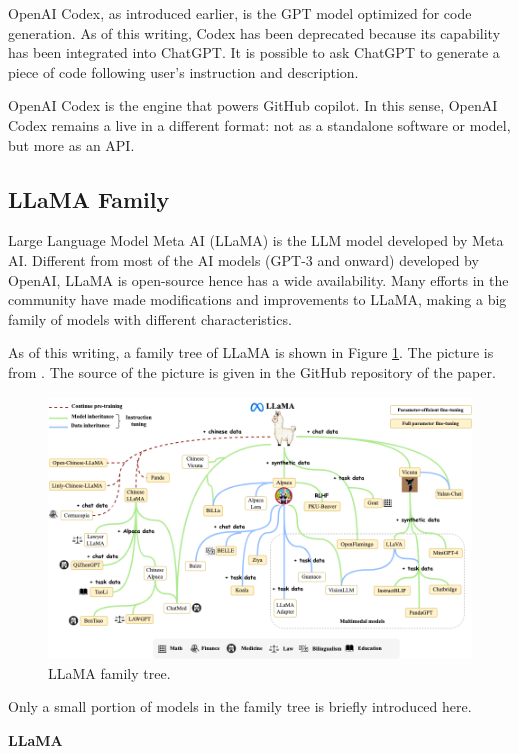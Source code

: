 OpenAI Codex, as introduced earlier, is the GPT model optimized for code generation. As of this writing, Codex has been deprecated because its capability has been integrated into ChatGPT. It is possible to ask ChatGPT to generate a piece of code following user's instruction and description.

OpenAI Codex is the engine that powers GitHub copilot. In this sense, OpenAI Codex remains a live in a different format: not as a standalone software or model, but more as an API.

\subsection{LLaMA Family}

Large Language Model Meta AI (LLaMA) is the LLM model developed by Meta AI. Different from most of the AI models (GPT-3 and onward) developed by OpenAI, LLaMA is open-source hence has a wide availability. Many efforts in the community have made modifications and improvements to LLaMA, making a big family of models with different characteristics.

As of this writing, a family tree of LLaMA is shown in Figure \ref{fig:llama_family_tree}. The picture is from \cite{zhao2023survey}. The source of the picture is given in the GitHub repository of the paper.
\begin{figure}[!htb]
	\centering
	\includegraphics[width=\textwidth]{./chapters/part-4/figures/lamma_family_tree.png}
	\caption{LLaMA family tree.}
	\label{fig:llama_family_tree}
\end{figure}
Only a small portion of models in the family tree is briefly introduced here.

\vspace{0.1in}
\noindent \textbf{LLaMA}
\vspace{0.1in}

